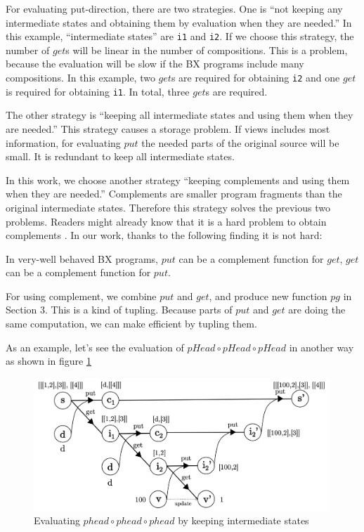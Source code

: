 For evaluating put-direction, there are two strategies. One is ``not keeping any intermediate states and obtaining them by evaluation when they are needed.'' In this example, ``intermediate states'' are \texttt{i1} and \texttt{i2}.
If we choose this strategy, the number of $get$s will be linear in the number of compositions. This is a problem, because the evaluation will be slow if the BX programs include many compositions. In this example, two $get$s are required for obtaining \texttt{i2} and one $get$ is required for obtaining \texttt{i1}. In total, three $get$s are required.

The other strategy is ``keeping all intermediate states and using them when they are needed.'' This strategy causes a storage problem. If views includes most information, for evaluating $put$ the needed parts of the original source will be small. It is redundant to keep all intermediate states.

In this work, we choose another strategy ``keeping complements and using them when they are needed.'' Complements are smaller program fragments than the original intermediate states. Therefore this strategy solves the previous two problems.
Readers might already know that it is a hard problem to obtain complements \cite{}. In our work, thanks to the following finding it is not hard:

\vspace{2mm}
In very-well behaved BX programs, 
$put$ can be a complement function for $get$, $get$ can be a complement function for $put$.
\vspace{2mm}

For using complement, we combine $put$ and $get$, and produce new function $pg$ in Section 3.
This is a kind of tupling. Because parts of $put$ and $get$ are doing the same computation, we can make efficient by tupling them.

As an example, let's see the evaluation of $pHead \circ pHead \circ pHead$ in another way as shown in figure \ref{fig:eval-comp-phead-2}

\begin{figure}[!htb]
  \centering
  \includegraphics[height=5cm]{./fig/fig3.png}
  \caption{Evaluating $phead \circ phead \circ phead$ by keeping intermediate states}
  \label{fig:eval-comp-phead-2}
\end{figure}

